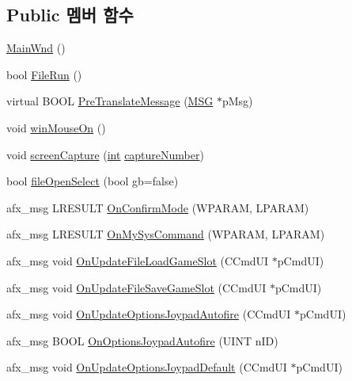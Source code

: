 \subsection*{Public 멤버 함수}
\begin{DoxyCompactItemize}
\item 
\mbox{\hyperlink{class_main_wnd_a2d94400e58869223b5a2797114577981}{Main\+Wnd}} ()
\item 
bool \mbox{\hyperlink{class_main_wnd_a946cd4793215a424eb736af418ccbc3d}{File\+Run}} ()
\item 
virtual B\+O\+OL \mbox{\hyperlink{class_main_wnd_a540792c5b97a767144d2bd821c46bfb3}{Pre\+Translate\+Message}} (\mbox{\hyperlink{prof_8cpp_a0c719c414608ef14852670b063876c07}{M\+SG}} $\ast$p\+Msg)
\item 
void \mbox{\hyperlink{class_main_wnd_aadc325bab367045adb1258609f8f2c9e}{win\+Mouse\+On}} ()
\item 
void \mbox{\hyperlink{class_main_wnd_aea243ed57e88a9efec1196d510d6b235}{screen\+Capture}} (\mbox{\hyperlink{_util_8cpp_a0ef32aa8672df19503a49fab2d0c8071}{int}} \mbox{\hyperlink{_g_b_a_8cpp_abb7ca669d5960ddd254a11d9fa646ff0}{capture\+Number}})
\item 
bool \mbox{\hyperlink{class_main_wnd_a872b497a88ca77012694cc909c62e6e4}{file\+Open\+Select}} (bool gb=false)
\item 
afx\+\_\+msg L\+R\+E\+S\+U\+LT \mbox{\hyperlink{class_main_wnd_a6e5d37a503b080743b30005e2d51e28d}{On\+Confirm\+Mode}} (W\+P\+A\+R\+AM, L\+P\+A\+R\+AM)
\item 
afx\+\_\+msg L\+R\+E\+S\+U\+LT \mbox{\hyperlink{class_main_wnd_a314268b72fbd07b1e4fe0b96dada585e}{On\+My\+Sys\+Command}} (W\+P\+A\+R\+AM, L\+P\+A\+R\+AM)
\item 
afx\+\_\+msg void \mbox{\hyperlink{class_main_wnd_a3b43dc9ab5ebe806a89d50eca3820369}{On\+Update\+File\+Load\+Game\+Slot}} (C\+Cmd\+UI $\ast$p\+Cmd\+UI)
\item 
afx\+\_\+msg void \mbox{\hyperlink{class_main_wnd_a55a4bc3c3b2b956aa3a58af9a0656a79}{On\+Update\+File\+Save\+Game\+Slot}} (C\+Cmd\+UI $\ast$p\+Cmd\+UI)
\item 
afx\+\_\+msg void \mbox{\hyperlink{class_main_wnd_a3cb911708a00979763e000bed2023791}{On\+Update\+Options\+Joypad\+Autofire}} (C\+Cmd\+UI $\ast$p\+Cmd\+UI)
\item 
afx\+\_\+msg B\+O\+OL \mbox{\hyperlink{class_main_wnd_a2b3ef3e8d807f8399870b6a898fbd4e3}{On\+Options\+Joypad\+Autofire}} (U\+I\+NT n\+ID)
\item 
afx\+\_\+msg void \mbox{\hyperlink{class_main_wnd_ae916bc94a817e76c6520085d2eeb0118}{On\+Update\+Options\+Joypad\+Default}} (C\+Cmd\+UI $\ast$p\+Cmd\+UI)

\end{DoxyCompactItemize}
